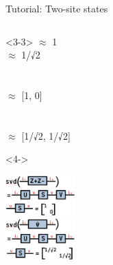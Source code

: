\begin{frame}[fragile]{Tutorial: Two-site states}
\begin{columns}
\begin{column}{5cm}
\begin{onlyenv}<3-3>
$\approx$ 1 \\
$\approx$ 1/√2 \\
~\\
~\\
$\approx$ [1, 0] \\
~\\
~\\
$\approx$ [1/√2, 1/√2]
\end{onlyenv}

\begin{onlyenv}<4->
\vspace*{0.0cm}
\begin{center}
\includegraphics[width=0.2\textwidth]{
  slides/assets/svd_ZpZm12.png
} \\
\includegraphics[width=0.2\textwidth]{
  slides/assets/svd_cat12.png
}
\end{center}
\vspace*{0.0cm}
\end{onlyenv}

\end{column}

\end{columns}

\end{frame}
